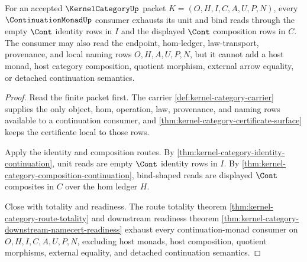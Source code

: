 \begin{theorem}
\label{thm:kernel-category-continuation-monad-consumer-exhaustion}
For an accepted $\KernelCategoryUp$ packet $K=(O,H,I,C,A,U,P,N)$, every $\ContinuationMonadUp$ consumer exhausts its unit and bind reads through the empty $\Cont$ identity rows in $I$ and the displayed $\Cont$ composition rows in $C$. The consumer may also read the endpoint, hom-ledger, law-transport, provenance, and local naming rows $O,H,A,U,P,N$, but it cannot add a host monad, host category composition, quotient morphism, external arrow equality, or detached continuation semantics.
\end{theorem}
\begin{proof}
Read the finite packet first. The carrier \autoref{def:kernel-category-carrier} supplies the only object, hom, operation, law, provenance, and naming rows available to a continuation consumer, and \autoref{thm:kernel-category-certificate-surface} keeps the certificate local to those rows.

Apply the identity and composition routes. By \autoref{thm:kernel-category-identity-continuation}, unit reads are empty $\Cont$ identity rows in $I$. By \autoref{thm:kernel-category-composition-continuation}, bind-shaped reads are displayed $\Cont$ composites in $C$ over the hom ledger $H$.

Close with totality and readiness. The route totality theorem \autoref{thm:kernel-category-route-totality} and downstream readiness theorem \autoref{thm:kernel-category-downstream-namecert-readiness} exhaust every continuation-monad consumer on $O,H,I,C,A,U,P,N$, excluding host monads, host composition, quotient morphisms, external equality, and detached continuation semantics.
\end{proof}

